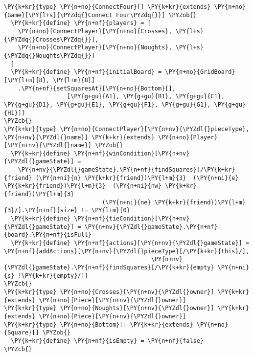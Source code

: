 \begin{Verbatim}[commandchars=\\\{\}]
\PY{k+kr}{type} \PY{n+no}{ConnectFour}[] \PY{k+kr}{extends} \PY{n+no}{Game}[\PY{l+s}{\PYZdq{}Connect Four\PYZdq{}}] \PYZob{}
  \PY{k+kr}{define} \PY{n+nf}{players} = [
    \PY{n+no}{ConnectPlayer}[\PY{n+no}{Crosses}, \PY{l+s}{\PYZdq{}Crosses\PYZdq{}}],
    \PY{n+no}{ConnectPlayer}[\PY{n+no}{Noughts}, \PY{l+s}{\PYZdq{}Noughts\PYZdq{}}]
  ]
  \PY{k+kr}{define} \PY{n+nf}{initialBoard} = \PY{n+no}{GridBoard}[\PY{l+m}{8}, \PY{l+m}{8}]
    .\PY{n+nf}{setSquaresAt}[\PY{n+no}{Bottom}[],
                  [\PY{g+gu}{A1}, \PY{g+gu}{B1}, \PY{g+gu}{C1}, \PY{g+gu}{D1}, \PY{g+gu}{E1}, \PY{g+gu}{F1}, \PY{g+gu}{G1}, \PY{g+gu}{H1}]]
\PYZcb{}
\PY{k+kr}{type} \PY{n+no}{ConnectPlayer}[\PY{n+nv}{\PYZdl{}pieceType}, \PY{n+nv}{\PYZdl{}name}] \PY{k+kr}{extends} \PY{n+no}{Player}[\PY{n+nv}{\PYZdl{}name}] \PYZob{}
  \PY{k+kr}{define} \PY{n+nf}{winCondition}[\PY{n+nv}{\PYZdl{}gameState}] =
    \PY{n+nv}{\PYZdl{}gameState}.\PY{n+nf}{findSquares}[/\PY{k+kr}{friend} (\PY{n+ni}{n} \PY{k+kr}{friend})\PY{l+m}{3}  (\PY{n+ni}{e} \PY{k+kr}{friend})\PY{l+m}{3}  (\PY{n+ni}{nw} \PY{k+kr}{friend})\PY{l+m}{3}
                            (\PY{n+ni}{ne} \PY{k+kr}{friend})\PY{l+m}{3}/].\PY{n+nf}{size} != \PY{l+m}{0}
  \PY{k+kr}{define} \PY{n+nf}{tieCondition}[\PY{n+nv}{\PYZdl{}gameState}] = \PY{n+nv}{\PYZdl{}gameState}.\PY{n+nf}{board}.\PY{n+nf}{isFull}
  \PY{k+kr}{define} \PY{n+nf}{actions}[\PY{n+nv}{\PYZdl{}gameState}] = \PY{n+nf}{addActions}[\PY{n+nv}{\PYZdl{}pieceType}[/\PY{k+kr}{this}/],
                                          \PY{n+nv}{\PYZdl{}gameState}.\PY{n+nf}{findSquares}[/\PY{k+kr}{empty} \PY{n+ni}{s} !\PY{k+kr}{empty}/]]
\PYZcb{}
\PY{k+kr}{type} \PY{n+no}{Crosses}[\PY{n+nv}{\PYZdl{}owner}] \PY{k+kr}{extends} \PY{n+no}{Piece}[\PY{n+nv}{\PYZdl{}owner}]
\PY{k+kr}{type} \PY{n+no}{Noughts}[\PY{n+nv}{\PYZdl{}owner}] \PY{k+kr}{extends} \PY{n+no}{Piece}[\PY{n+nv}{\PYZdl{}owner}]
\PY{k+kr}{type} \PY{n+no}{Bottom}[] \PY{k+kr}{extends} \PY{n+no}{Square}[] \PYZob{}
  \PY{k+kr}{define} \PY{n+nf}{isEmpty} = \PY{n+nf}{false}
\PYZcb{}
\end{Verbatim}
